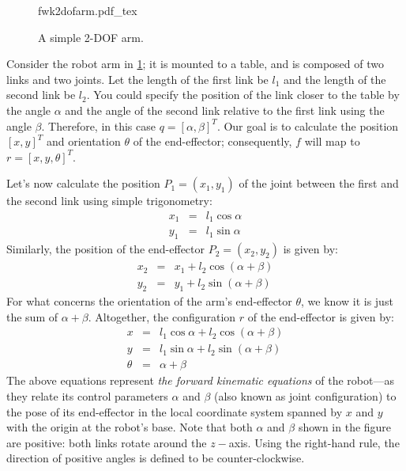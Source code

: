 \begin{figure}[!htb]%
    \centering
    \def\svgwidth{0.4\textwidth}
    {fwk2dofarm.pdf_tex}
    \caption{A simple 2-DOF arm.}\label{fig:fwk2dofarm}
\end{figure}

Consider the robot arm in \cref{fig:fwk2dofarm}; it is mounted to a table, and is composed of two links and two joints. Let the length of the first link be $l_1$ and the length of the second link be $l_2$. You could specify the position of the link closer to the table by the angle $\alpha$ and the angle of the second link relative to the first link using the angle $\beta$.
Therefore, in this case $q = [\alpha, \beta]^T$.
Our goal is to calculate the position $[x, y]^T$ and orientation $\theta$ of the end-effector; consequently, $f$ will map to $r = [x, y, \theta]^T$.

Let's now calculate the position $P_1 = (x_1, y_1)$ of the joint between the first and the second link using simple trigonometry:
%
\begin{eqnarray}\label{eq:cosxl1}
x_1 &=&l_1 \cos \alpha \nonumber \\
y_1 &=&l_1 \sin \alpha
\end{eqnarray}
%
Similarly, the position of the end-effector $P_2 = (x_2, y_2)$ is given by:
%
\begin{eqnarray}
x_2&=&x_1 + l_2 \cos(\alpha+\beta) \nonumber \\
y_2&=&y_1 + l_2 \sin(\alpha+\beta)
\end{eqnarray}
%
For what concerns the orientation of the arm's end-effector $\theta$, we know it is just the sum of $\alpha+\beta$.
Altogether, the configuration $r$ of the end-effector is given by:
%
\begin{eqnarray}\label{eq:fwk2dofarm}
x&=&l_1 \cos \alpha + l_2 \cos(\alpha+\beta) \nonumber \\
y&=&l_1 \sin \alpha + l_2 \sin(\alpha+\beta) \\
\theta&=& \alpha + \beta \nonumber
\end{eqnarray}
%
The above equations represent \textsl{the forward kinematic equations} of the robot---as they relate its control parameters $ \alpha$ and $\beta$ (also known as joint configuration) to the pose of its end-effector in the local coordinate system spanned by $x$ and $ y$ with the origin at the robot's base.
Note that both $\alpha$ and $\beta$ shown in the figure are positive: both links rotate around the $z-$axis. Using the right-hand rule, the direction of positive angles is defined to be counter-clockwise.

